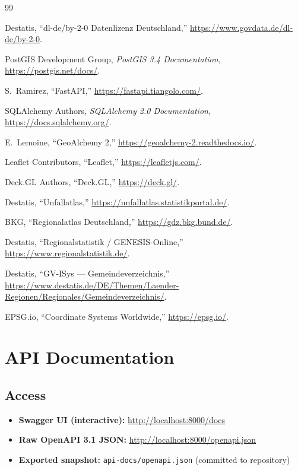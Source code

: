 \documentclass[12pt,a4paper]{article}
\begin{document}
\newpage
\begin{thebibliography}{99}

Destatis, ``dl-de/by-2-0 Datenlizenz Deutschland,''
\url{https://www.govdata.de/dl-de/by-2-0}.

PostGIS Development Group, \textit{PostGIS 3.4 Documentation},
\url{https://postgis.net/docs/}.

S.~Ramirez, ``FastAPI,'' \url{https://fastapi.tiangolo.com/}.

SQLAlchemy Authors, \textit{SQLAlchemy 2.0 Documentation},
\url{https://docs.sqlalchemy.org/}.

E.~Lemoine, ``GeoAlchemy 2,'' \url{https://geoalchemy-2.readthedocs.io/}.

Leaflet Contributors, ``Leaflet,'' \url{https://leafletjs.com/}.

Deck.GL Authors, ``Deck.GL,'' \url{https://deck.gl/}.

Destatis, ``Unfallatlas,'' \url{https://unfallatlas.statistikportal.de/}.

BKG, ``Regionalatlas Deutschland,'' \url{https://gdz.bkg.bund.de/}.

Destatis, ``Regionalstatistik / GENESIS-Online,''
\url{https://www.regionalstatistik.de/}.

Destatis, ``GV-ISys --- Gemeindeverzeichnis,''
\url{https://www.destatis.de/DE/Themen/Laender-Regionen/Regionales/Gemeindeverzeichnis/}.

EPSG.io, ``Coordinate Systems Worldwide,'' \url{https://epsg.io/}.

\end{thebibliography}

\newpage
\appendix
\section{API Documentation}
\label{app:api}

\subsection*{Access}

\begin{itemize}
  \item \textbf{Swagger UI (interactive):} \url{http://localhost:8000/docs}
  \item \textbf{Raw OpenAPI 3.1 JSON:} \url{http://localhost:8000/openapi.json}
  \item \textbf{Exported snapshot:} \texttt{api-docs/openapi.json} (committed to repository)
\end{itemize}
\end{document}
